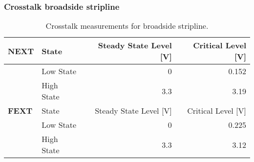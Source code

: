\documentclass[../main.tex]{subfiles}
\begin{document}
\subsubsection{Crosstalk broadside stripline}

\begin{table}[h]
    \centering
    \begin{tabular}{l l|r r}
        \toprule[1pt]
        \textbf{NEXT} & State & Steady State Level [V] & Critical Level [V] \\
        \midrule
        & Low State & 0 & 0.152 \\
        & High State & 3.3 & 3.19 \\
        \midrule[1pt]
        \textbf{FEXT} & State & Steady State Level [V] & Critical Level [V] \\
        \midrule
        & Low State & 0 & 0.225 \\
        & High State & 3.3 & 3.12 \\
        \bottomrule[1pt]
    \end{tabular}
    \caption{Crosstalk measurements for broadside stripline.}
    \label{tab:meas-broadside-stripline2}
\end{table}
\end{document}
